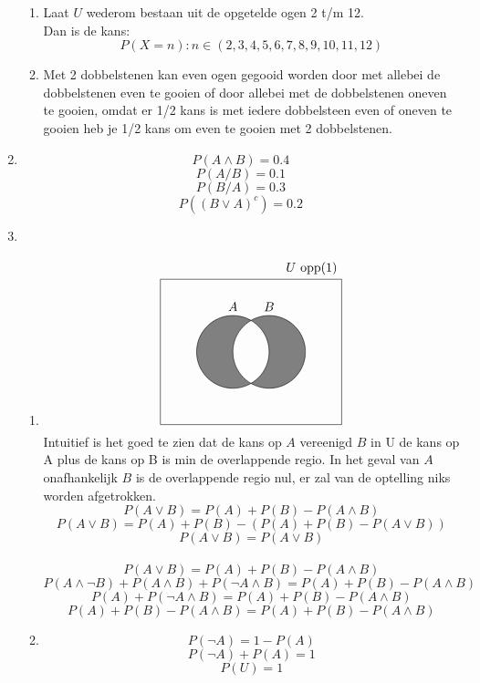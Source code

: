 \documentclass[pdftex,12pt,a4paper]{article}
\begin{document}
\begin{enumerate}
\begin{enumerate}
                
            \item
            	Laat $U$ wederom bestaan uit de opgetelde ogen 2 t/m 12.\\
            	Dan is de kans:
            		$$P(X=n) : n \in (2,3,4,5,6,7,8,9,10,11,12)$$
            \item
            	Met 2 dobbelstenen kan even ogen gegooid worden door met allebei
                de dobbelstenen even te gooien of door allebei met de
                dobbelstenen oneven te gooien, omdat er 1/2 kans is met iedere
                dobbelsteen even of oneven te gooien heb je 1/2 kans om even te
                gooien met 2 dobbelstenen.
        \end{enumerate}
       	\newpage

    \item
    	$$P(A \wedge B) = 0.4$$
    	$$P(A/B) = 0.1$$
    	$$P(B/A) = 0.3$$
    	$$P((B \vee A)^c) = 0.2$$

	\item
    	\begin{enumerate}
    		\item
    			$$
                \begin{tikzpicture}[fill=gray]
                \scope
                \clip (-2,-2) rectangle (2,2)
                      (1,0) circle (1);
                \fill (0,0) circle (1);
                \endscope
                \scope
                \clip (-2,-2) rectangle (2,2)
                      (0,0) circle (1);
                \fill (1,0) circle (1);
                \endscope
                \draw (0,0) circle (1) (0,1)  node [text=black,above] {$A$}
                      (1,0) circle (1) (1,1)  node [text=black,above] {$B$}
                      (-2,-2) rectangle (3,2) node [text=black,above left] {$U$ opp(1)};
                \end{tikzpicture}
				$$
                Intuitief is het goed te zien dat de kans op $A$ vereenigd $B$ in U de
                kans op A plus de kans op B is min de overlappende regio.
                In het geval van $A$ onafhankelijk $B$ is de overlappende regio
                nul, er zal van de optelling niks worden afgetrokken.
    			$$P(A \vee B) = P(A) + P(B) - P(A \wedge B)$$
    			$$P(A \vee B) = P(A) + P(B) - (P(A) + P(B) - P(A \vee B))$$
    			$$P(A \vee B) = P(A \vee B)$$
    			\\
    			$$P(A \vee B) = P(A) + P(B) - P(A \wedge B)$$
    			$$P(A \wedge \neg B) + P(A \wedge B) + P(\neg A \wedge B) = P(A) + P(B) - P(A \wedge B)$$
    			$$P(A) + P(\neg A \wedge B) = P(A) + P(B) - P(A \wedge B)$$
    			$$P(A) + P(B) - P(A \wedge B) = P(A) + P(B) - P(A \wedge B)$$
    		\item
    			$$P(\neg A) = 1 - P(A)$$
    			$$P(\neg A) + P(A) = 1$$
    			$$P(U) = 1$$


\end{enumerate}
\end{enumerate}
\end{document}
